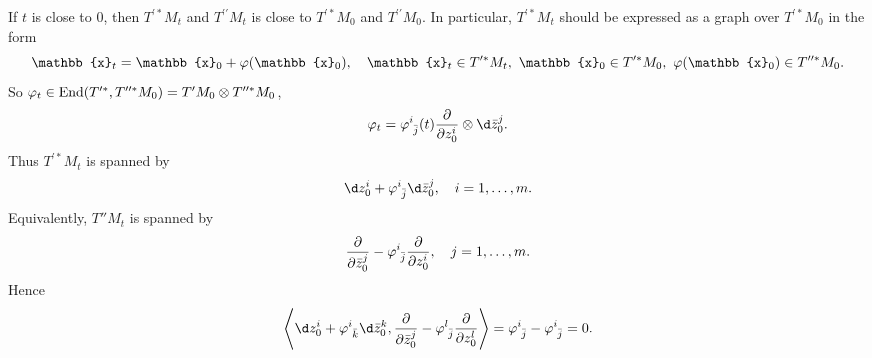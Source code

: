 \documentclass[12pt]{article}
\begin{document}
If \(t\) is close to 0, then \(T^{\prime*}M_t\) and \(T^{\prime\prime}M_t\) is
close to \(T^{\prime*}M_0\) and \(T^{\prime\prime}M_0\). In particular,
\(T^{\prime*}M_t\) should be expressed as a graph over \(T^{\prime*}M_0\) in the form
\[
  \mathbb{x}_t=\mathbb{x}_0+\vphi(\mathbb{x}_0),\quad
  \mathbb{x}_t\in T^{\prime*}M_t,\ \mathbb{x}_0\in T^{\prime*}M_0,\ 
  \vphi(\mathbb{x}_0)\in T^{\prime\prime*}M_0
.\] So \(\varphi_t\in \operatorname{End}(T^{\prime*},T^{\prime\prime*}M_0)=T'M_0\otimes 
T^{\prime\prime*}M_0\), \[
  \vphi_t=\vphi\indices{^i_{\bar{j}}}(t)\pd{z^i_0}\otimes\dd{\bar{z}^j_0}
.\] Thus \(T^{\prime*}M_t\) is spanned by \[
  \dd{z^i_0}+\vphi\indices{^i_{\bar{j}}}\dd{\bar{z}^j_0},\quad i=1,\ldots,m
.\] Equivalently, \(T''M_t\) is spanned by \[
  \pd{\bar{z}^j_0}-\vphi\indices{^i_{\bar{j}}}\pd{z^i_0},\quad j=1,\ldots,m
.\] Hence \[
  \left<\dd{z}^i_0+\vphi\indices{^i_{\bar{k}}}\dd{\bar{z}^k_0},
  \pd{\bar{z}^j_0}-\vphi\indices{^l_{\bar{j}}}\pd{z^l_0}\right> 
  =\vphi\indices{^i_{\bar{j}}}-\vphi\indices{^i_{\bar{j}}}=0
.\] 
\end{document}
